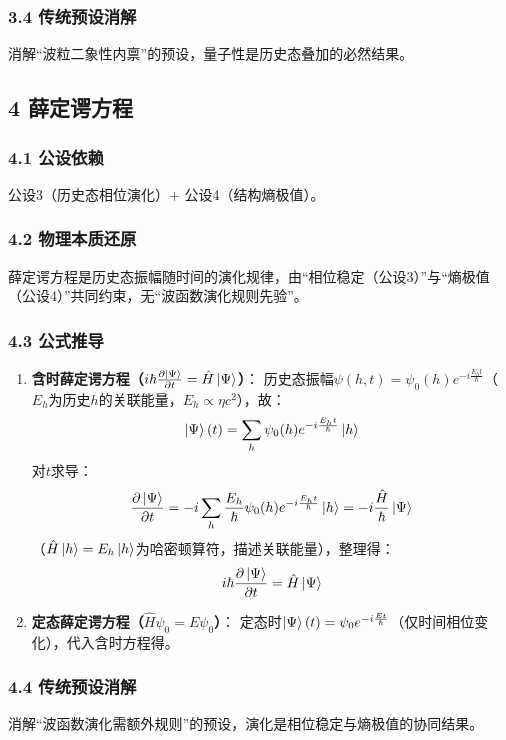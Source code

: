 \documentclass{article}
\newcommand{\et}{\eta}           %
\newcommand{\hb}{\hbar}          %
\newcommand{\ps}{\ket{\Psi}}     %
\newcommand{\hs}{\ket{h}}        %
\begin{document}
\subsubsection{3.4 传统预设消解}
消解“波粒二象性内禀”的预设，量子性是历史态叠加的必然结果。


\subsection{4 薛定谔方程}
\subsubsection{4.1 公设依赖}
公设3（历史态相位演化）+ 公设4（结构熵极值）。

\subsubsection{4.2 物理本质还原}
薛定谔方程是历史态振幅随时间的演化规律，由“相位稳定（公设3）”与“熵极值（公设4）”共同约束，无“波函数演化规则先验”。

\subsubsection{4.3 公式推导}
\begin{enumerate}
    \item \textbf{含时薛定谔方程（$i\hb \frac{\partial \ps}{\partial t} = \hat{H} \ps$）}：  
      历史态振幅$\psi(h,t) = \psi_0(h) e^{-i \frac{E_h t}{\hb}}$（$E_h$为历史$h$的关联能量，$E_h \propto \et c^2$），故：  
      $$\ps(t) = \sum_h \psi_0(h) e^{-i \frac{E_h t}{\hb}} \hs$$  
      对$t$求导：  
      $$\frac{\partial \ps}{\partial t} = -i \sum_h \frac{E_h}{\hb} \psi_0(h) e^{-i \frac{E_h t}{\hb}} \hs = -i \frac{\hat{H}}{\hb} \ps$$  
      （$\hat{H} \hs = E_h \hs$为哈密顿算符，描述关联能量），整理得：  
      $$i\hb \frac{\partial \ps}{\partial t} = \hat{H} \ps$$
    
    \item \textbf{定态薛定谔方程（$\hat{H} \psi_0 = E \psi_0$）}：  
      定态时$\ps(t) = \psi_0 e^{-i \frac{E t}{\hb}}$（仅时间相位变化），代入含时方程得。
\end{enumerate}

\subsubsection{4.4 传统预设消解}
消解“波函数演化需额外规则”的预设，演化是相位稳定与熵极值的协同结果。
\end{document}
